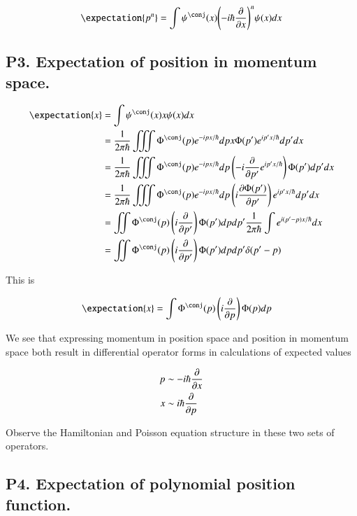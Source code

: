 \begin{align*}
\expectation{p^n} 
&= \int \psi^\conj(x) {\left( -i \hbar \PD{x}{} \right)}^n {\psi(x)} dx \\
\end{align*}

\subsection{P3.  Expectation of position in momentum space. }

\begin{align*}
\expectation{x} 
&= \int \psi^\conj(x) x \psi(x) dx \\
&= 
\inv{2\pi\hbar} \iiint \Phi^\conj(p) e^{-ipx/\hbar} dp x \Phi(p') e^{ip'x/\hbar} dp' dx \\
&= 
\inv{2\pi\hbar} \iiint \Phi^\conj(p) e^{-ipx/\hbar} dp \left( -i \PD{p'}{} e^{ip'x/\hbar} \right) \Phi(p') dp' dx \\
&= 
\inv{2\pi\hbar} \iiint \Phi^\conj(p) e^{-ipx/\hbar} dp \left( i \PD{p'}{\Phi(p')} \right) e^{ip'x/\hbar} dp' dx \\
&= 
\iint \Phi^\conj(p) \left( i \PD{p'}{} \right) {\Phi(p')} dp dp' \inv{2\pi\hbar} \int e^{i(p'-p)x/\hbar} dx  \\
&= 
\iint \Phi^\conj(p) \left( i \PD{p'}{} \right) {\Phi(p')} dp dp' \delta(p'-p)  \\
\end{align*}

This is

\begin{align*}
\expectation{x} &= \int \Phi^\conj(p) \left( i \PD{p}{} \right) {\Phi(p)} dp 
\end{align*}

We see that expressing momentum in position space and position in momentum space both result in differential
operator forms in calculations of expected values

\begin{align}\label{eqn:operatorCorrespondance}
p &\sim -i \hbar \frac{\partial {}}{\partial {x}} \\
x &\sim i \hbar \frac{\partial {}}{\partial {p}}
\end{align}

Observe the Hamiltonian and Poisson equation structure in these two sets of operators.

\subsection{P4. Expectation of polynomial position function. }

